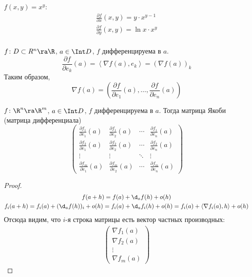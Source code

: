 \begin{exmp}
	$f(x, y) = x^y$:
	\begin{gather*}
		\frac{\partial f}{\partial x} (x, y) = y \cdot x^{y - 1} \\
		\frac{\partial f}{\partial y} (x, y) = \ln x \cdot x^y \\
	\end{gather*}
\end{exmp}

\begin{conseq}
	$f\colon D \subset R^n \ra \R$, $a \in \Int D$, $f$ дифференцируема в $a$.
	\[ \frac{\partial f}{\partial e_k} (a) = \left<\nabla f(a), e_k\right> = (\nabla f(a))_k \]
	Таким образом,
	\[ \nabla f(a) = \left( \frac{\partial f}{\partial e_1} (a), \dots, \frac{\partial f}{\partial e_n} (a) \right) \]
\end{conseq}

\begin{conseq}
	$f\colon \R^n \ra \R^m$, $a \in \Int D$, $f$ дифференцируема в $a$.
	Тогда матрица Якоби (матрица дифференциала)
	\[\left(\begin{matrix}
		\frac{\partial f_1}{\partial e_1}(a) & \frac{\partial f_1}{\partial e_2}(a)
			&\cdots& \frac{\partial f_1}{\partial e_n}(a) \\
		\frac{\partial f_2}{\partial e_1}(a) & \frac{\partial f_2}{\partial e_2}(a) 
			&\cdots& \frac{\partial f_2}{\partial e_n}(a) \\
		\vdots & \vdots & \ddots & \vdots \\
		\frac{\partial f_m}{\partial e_1}(a) & \frac{\partial f_m}{\partial e_2}(a) 
			&\cdots& \frac{\partial f_m}{\partial e_n}(a)
	\end{matrix}\right)\]
\end{conseq}
\begin{proof}
	\begin{gather*}
		f(a + h) = f(a) + \d_a f(h) + o(h) \\
		f_i(a + h) = f_i(a) + (\d_a f(h))_i + o(h) = f_i(a) + \d_a f_i(h) + o(h) = f_i(a) + \left<\nabla f_i(a), h\right> + o(h)
	\end{gather*}
	Отсюда видим, что $i$-я строка матрицы есть вектор частных производных:
	\begin{gather*}
		\left(\begin{matrix}
			\nabla f_1(a) \\
			\nabla f_2(a) \\
			\vdots \\
			\nabla f_m(a)
		\end{matrix}\right)
	\end{gather*}
\end{proof}

